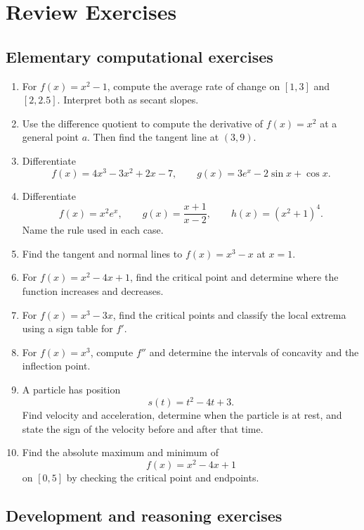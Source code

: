 \section{Review Exercises}

\subsection{Elementary computational exercises}

\begin{enumerate}
\item For $f(x)=x^2-1$, compute the average rate of change on $[1,3]$ and $[2,2.5]$. Interpret both as secant slopes.

\item Use the difference quotient to compute the derivative of $f(x)=x^2$ at a general point $a$. Then find the tangent line at $(3,9)$.

\item Differentiate
\[
f(x)=4x^3-3x^2+2x-7,
\qquad
g(x)=3e^x-2\sin x+\cos x.
\]

\item Differentiate
\[
f(x)=x^2e^x,
\qquad
g(x)=\frac{x+1}{x-2},
\qquad
h(x)=(x^2+1)^4.
\]
Name the rule used in each case.

\item Find the tangent and normal lines to $f(x)=x^3-x$ at $x=1$.

\item For $f(x)=x^2-4x+1$, find the critical point and determine where the function increases and decreases.

\item For $f(x)=x^3-3x$, find the critical points and classify the local extrema using a sign table for $f'$.

\item For $f(x)=x^3$, compute $f''$ and determine the intervals of concavity and the inflection point.

\item A particle has position
\[
s(t)=t^2-4t+3.
\]
Find velocity and acceleration, determine when the particle is at rest, and state the sign of the velocity before and after that time.

\item Find the absolute maximum and minimum of
\[
f(x)=x^2-4x+1
\]
on $[0,5]$ by checking the critical point and endpoints.
\end{enumerate}

\subsection{Development and reasoning exercises}

